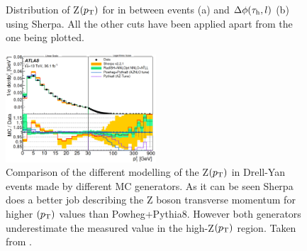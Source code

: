 \begin{figure}[H]
	\centering
	\hfill
	\caption{Distribution of Z$(p_\text{T})$ for in between events (a) and $\Delta\phi(\tau_\text{h},l)$ (b) using Sherpa. All the other cuts have been applied apart from the one being plotted.}
	\label{Fig19}
\end{figure}
\begin{figure}[H]
	\centering
	\includegraphics[width=0.5\textwidth]{figures/Fig20}
	\caption{Comparison of the different modelling of the Z$(p_\text{T})$ in Drell-Yan events made by different MC generators. As it can be seen Sherpa does a better job describing the Z boson transverse momentum for higher $(p_\text{T})$ values than Powheg+Pythia8. However both generators underestimate the measured value in the high-Z$(p_\text{T})$ region. Taken from \cite{Aad:2019wmn}.}
	\label{Fig20}
\end{figure}

